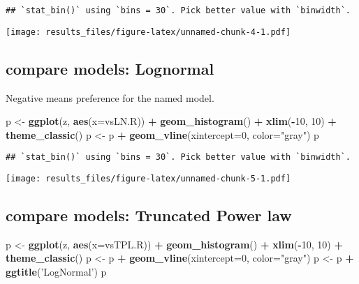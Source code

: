 \documentclass[]{article}
\newenvironment{Shaded}{\begin{snugshade}}{\end{snugshade}}
\newcommand{\DataTypeTok}[1]{\textcolor[rgb]{0.13,0.29,0.53}{#1}}
\newcommand{\DecValTok}[1]{\textcolor[rgb]{0.00,0.00,0.81}{#1}}
\newcommand{\KeywordTok}[1]{\textcolor[rgb]{0.13,0.29,0.53}{\textbf{#1}}}
\newcommand{\NormalTok}[1]{#1}
\newcommand{\OperatorTok}[1]{\textcolor[rgb]{0.81,0.36,0.00}{\textbf{#1}}}
\newcommand{\StringTok}[1]{\textcolor[rgb]{0.31,0.60,0.02}{#1}}
\begin{document}
\begin{verbatim}
## `stat_bin()` using `bins = 30`. Pick better value with `binwidth`.
\end{verbatim}

\texttt{[image: results\_files/figure-latex/unnamed-chunk-4-1.pdf]}

\hypertarget{compare-models-lognormal}{%
\subsection{compare models: Lognormal}\label{compare-models-lognormal}}

Negative means preference for the named model.

\begin{Shaded}
\begin{Highlighting}[]
\NormalTok{p <-}\StringTok{ }\KeywordTok{ggplot}\NormalTok{(z, }\KeywordTok{aes}\NormalTok{(}\DataTypeTok{x=}\NormalTok{vsLN.R)) }\OperatorTok{+}\StringTok{ }\KeywordTok{geom_histogram}\NormalTok{() }\OperatorTok{+}\StringTok{ }\KeywordTok{xlim}\NormalTok{(}\OperatorTok{-}\DecValTok{10}\NormalTok{, }\DecValTok{10}\NormalTok{) }\OperatorTok{+}\StringTok{ }\KeywordTok{theme_classic}\NormalTok{()}
\NormalTok{p <-}\StringTok{ }\NormalTok{p }\OperatorTok{+}\StringTok{ }\KeywordTok{geom_vline}\NormalTok{(}\DataTypeTok{xintercept=}\DecValTok{0}\NormalTok{, }\DataTypeTok{color=}\StringTok{"gray"}\NormalTok{)}
\NormalTok{p}
\end{Highlighting}
\end{Shaded}

\begin{verbatim}
## `stat_bin()` using `bins = 30`. Pick better value with `binwidth`.
\end{verbatim}

\texttt{[image: results\_files/figure-latex/unnamed-chunk-5-1.pdf]}

\hypertarget{compare-models-truncated-power-law}{%
\subsection{compare models: Truncated Power
law}\label{compare-models-truncated-power-law}}

\begin{Shaded}
\begin{Highlighting}[]
\NormalTok{p <-}\StringTok{ }\KeywordTok{ggplot}\NormalTok{(z, }\KeywordTok{aes}\NormalTok{(}\DataTypeTok{x=}\NormalTok{vsTPL.R)) }\OperatorTok{+}\StringTok{ }\KeywordTok{geom_histogram}\NormalTok{() }\OperatorTok{+}\StringTok{ }\KeywordTok{xlim}\NormalTok{(}\OperatorTok{-}\DecValTok{10}\NormalTok{, }\DecValTok{10}\NormalTok{) }\OperatorTok{+}\StringTok{ }\KeywordTok{theme_classic}\NormalTok{()}
\NormalTok{p <-}\StringTok{ }\NormalTok{p }\OperatorTok{+}\StringTok{ }\KeywordTok{geom_vline}\NormalTok{(}\DataTypeTok{xintercept=}\DecValTok{0}\NormalTok{, }\DataTypeTok{color=}\StringTok{"gray"}\NormalTok{)}
\NormalTok{p <-}\StringTok{ }\NormalTok{p }\OperatorTok{+}\StringTok{ }\KeywordTok{ggtitle}\NormalTok{(}\StringTok{'LogNormal'}\NormalTok{)}
\NormalTok{p}
\end{Highlighting}
\end{Shaded}
\end{document}
